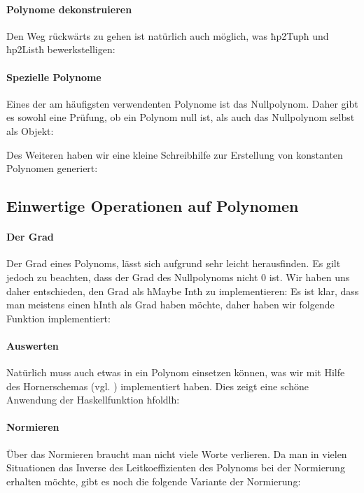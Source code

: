 \paragraph{Polynome dekonstruieren}
Den Weg rückwärts zu gehen ist natürlich auch möglich, was ħp2Tupħ und ħp2Listħ
bewerkstelligen:



\paragraph{Spezielle Polynome}
Eines der am häufigsten verwendenten Polynome ist das Nullpolynom. Daher gibt
es sowohl eine Prüfung, ob ein Polynom null ist, als auch das Nullpolynom
selbst als Objekt:


Des Weiteren haben wir eine kleine Schreibhilfe zur Erstellung von konstanten
Polynomen generiert:

\subsection{Einwertige Operationen auf Polynomen}

\paragraph{Der Grad} Der Grad eines Polynoms, lässt sich aufgrund 
 sehr leicht herausfinden. Es gilt jedoch zu beachten, dass der
Grad des Nullpolynoms nicht $0$ ist. Wir haben uns daher entschieden, den Grad
als ħMaybe Intħ zu implementieren:
Es ist klar, dass man meistens einen ħIntħ als Grad haben möchte, daher haben
wir folgende Funktion implementiert:

\paragraph{Auswerten} Natürlich muss auch etwas in ein Polynom einsetzen
können, was wir mit Hilfe des Hornerschemas (vgl.
\autocite{wiki:horner-schema})
implementiert haben. Dies zeigt eine schöne Anwendung der Haskellfunktion 
ħfoldlħ:


\paragraph{Normieren} Über das Normieren braucht man nicht viele Worte
verlieren.
Da man in vielen Situationen das Inverse des Leitkoeffizienten des Polynoms 
bei der Normierung erhalten möchte, gibt es noch die folgende Variante der Normierung:

